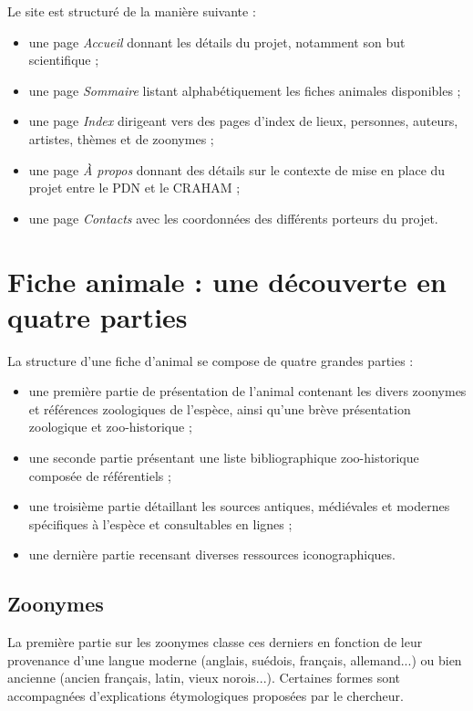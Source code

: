 \documentclass[a4paper,12pt,twoside]{book}
\begin{document}
Le site est structuré de la manière suivante :

\begin{itemize}
    \item une page \textit{Accueil} donnant les détails du projet, notamment son but scientifique ;
    \item une page \textit{Sommaire} listant alphabétiquement les fiches animales disponibles ;
    \item une page \textit{Index} dirigeant vers des pages d'index de lieux, personnes, auteurs, artistes, thèmes et de zoonymes ;
    \item une page \textit{À propos} donnant des détails sur le contexte de mise en place du projet entre le \acrshort{PDN} et le \acrshort{CRAHAM} ;
    \item une page \textit{Contacts} avec les coordonnées des différents porteurs du projet.
\end{itemize}


\section{Fiche animale : une découverte en quatre parties}

La structure d'une fiche d'animal se compose de quatre grandes parties : 

\begin{itemize}
    \item une première partie de présentation de l'animal contenant les divers zoonymes et références zoologiques de l'espèce, ainsi qu'une brève présentation zoologique et zoo-historique ;
    \item une seconde partie présentant une liste bibliographique zoo-historique composée de référentiels ;
    \item une troisième partie détaillant les sources antiques, médiévales et modernes spécifiques à l'espèce et consultables en lignes ;
    \item une dernière partie recensant diverses ressources iconographiques.
\end{itemize}

\subsection{Zoonymes}
La première partie sur les zoonymes classe ces derniers en fonction de leur provenance d'une langue moderne (anglais, suédois, français, allemand...) ou bien ancienne (ancien français, latin, vieux norois...). Certaines formes sont accompagnées d'explications étymologiques proposées par le chercheur.
\end{document}
